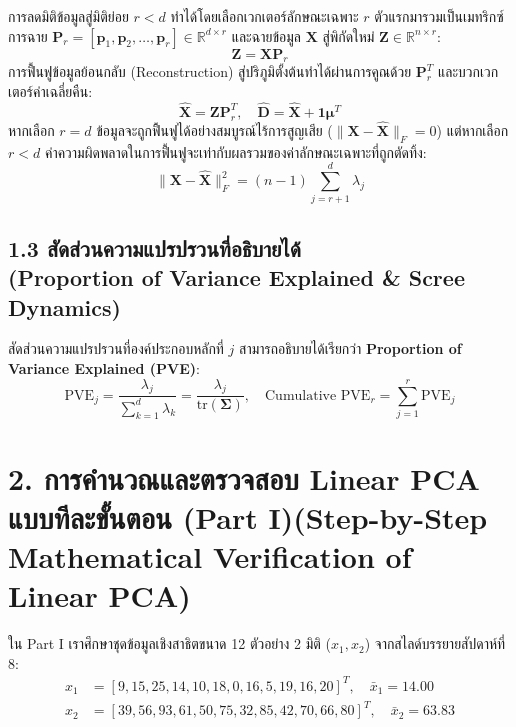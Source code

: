 \documentclass[12pt,a4paper]{article}
\begin{document}
การลดมิติข้อมูลสู่มิติย่อย $r < d$ ทำได้โดยเลือกเวกเตอร์ลักษณะเฉพาะ $r$ ตัวแรกมารวมเป็นเมทริกซ์การฉาย $\mathbf{P}_r = [\mathbf{p}_1, \mathbf{p}_2, \dots, \mathbf{p}_r] \in \mathbb{R}^{d \times r}$ และฉายข้อมูล $\mathbf{X}$ สู่พิกัดใหม่ $\mathbf{Z} \in \mathbb{R}^{n \times r}$:
\begin{equation}
    \mathbf{Z} = \mathbf{X} \mathbf{P}_r
\end{equation}
การฟื้นฟูข้อมูลย้อนกลับ (Reconstruction) สู่ปริภูมิตั้งต้นทำได้ผ่านการคูณด้วย $\mathbf{P}_r^T$ และบวกเวกเตอร์ค่าเฉลี่ยคืน:
\begin{equation}
    \hat{\mathbf{X}} = \mathbf{Z} \mathbf{P}_r^T, \quad \hat{\mathbf{D}} = \hat{\mathbf{X}} + \mathbf{1}\boldsymbol{\mu}^T
\end{equation}
หากเลือก $r = d$ ข้อมูลจะถูกฟื้นฟูได้อย่างสมบูรณ์ไร้การสูญเสีย ($\|\mathbf{X} - \hat{\mathbf{X}}\|_F = 0$) แต่หากเลือก $r < d$ ค่าความผิดพลาดในการฟื้นฟูจะเท่ากับผลรวมของค่าลักษณะเฉพาะที่ถูกตัดทิ้ง:
\begin{equation}
    \|\mathbf{X} - \hat{\mathbf{X}}\|_F^2 = (n-1) \sum_{j=r+1}^d \lambda_j
\end{equation}

\subsection*{1.3 สัดส่วนความแปรปรวนที่อธิบายได้\\ \normalsize(Proportion of Variance Explained \& Scree Dynamics)}
สัดส่วนความแปรปรวนที่องค์ประกอบหลักที่ $j$ สามารถอธิบายได้เรียกว่า \textbf{Proportion of Variance Explained (PVE)}:
\begin{equation}
    \text{PVE}_j = \frac{\lambda_j}{\sum_{k=1}^d \lambda_k} = \frac{\lambda_j}{\text{tr}(\boldsymbol{\Sigma})}, \quad \text{Cumulative PVE}_r = \sum_{j=1}^r \text{PVE}_j
\end{equation}

\clearpage
\section*{2. การคำนวณและตรวจสอบ Linear PCA แบบทีละขั้นตอน (Part I)\newline \large(Step-by-Step Mathematical Verification of Linear PCA)}

ใน Part I เราศึกษาชุดข้อมูลเชิงสาธิตขนาด 12 ตัวอย่าง 2 มิติ ($x_1, x_2$) จากสไลด์บรรยายสัปดาห์ที่ 8:
\begin{align*}
    x_1 &= [9, 15, 25, 14, 10, 18, 0, 16, 5, 19, 16, 20]^T, \quad \bar{x}_1 = 14.00\\
    x_2 &= [39, 56, 93, 61, 50, 75, 32, 85, 42, 70, 66, 80]^T, \quad \bar{x}_2 = 63.83
\end{align*}
\end{document}
